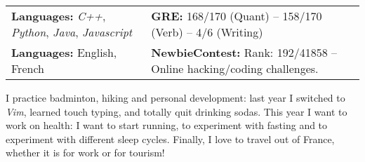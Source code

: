 \documentclass[a4paper, 12pt]{article}
\newcommand{\marginmisc}{0.3cm}
\begin{document}
\begin{footnotesize}
\noindent\begin{tabular}{@{}p{7cm}p{12cm}}
  \textbf{Languages:} \textit{C++}, \textit{Python}, \textit{Java}, \textit{Javascript} & \textbf{GRE:} 168/170 (Quant) -- 158/170 (Verb) -- 4/6 (Writing)\\
  \textbf{Languages:} English, French & \textbf{NewbieContest:} Rank: 192/41858 -- Online hacking/coding challenges.\\
\end{tabular}

\vspace{\marginmisc}

\renewcommand{\baselinestretch}{0.8}
I practice badminton, hiking and personal development: last year I switched to \textit{Vim}, learned touch typing, and totally quit drinking sodas. This year I want to work on health: I want to start running, to experiment with fasting and to experiment with different sleep cycles. Finally, I love to travel out of France, whether it is for work or for tourism!

\end{footnotesize}
\end{document}
